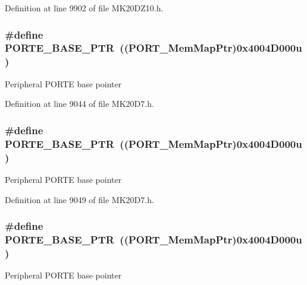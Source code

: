Definition at line 9902 of file M\+K20\+D\+Z10.\+h.

\subsubsection[{\texorpdfstring{P\+O\+R\+T\+E\+\_\+\+B\+A\+S\+E\+\_\+\+P\+TR}{PORTE_BASE_PTR}}]{\setlength{\rightskip}{0pt plus 5cm}\#define P\+O\+R\+T\+E\+\_\+\+B\+A\+S\+E\+\_\+\+P\+TR~(({\bf P\+O\+R\+T\+\_\+\+Mem\+Map\+Ptr})0x4004\+D000u)}\hypertarget{group___p_o_r_t___peripheral_gab166fe285bbb15b52de610f408fe25d3}{}\label{group___p_o_r_t___peripheral_gab166fe285bbb15b52de610f408fe25d3}
Peripheral P\+O\+R\+TE base pointer 

Definition at line 9044 of file M\+K20\+D7.\+h.

\subsubsection[{\texorpdfstring{P\+O\+R\+T\+E\+\_\+\+B\+A\+S\+E\+\_\+\+P\+TR}{PORTE_BASE_PTR}}]{\setlength{\rightskip}{0pt plus 5cm}\#define P\+O\+R\+T\+E\+\_\+\+B\+A\+S\+E\+\_\+\+P\+TR~(({\bf P\+O\+R\+T\+\_\+\+Mem\+Map\+Ptr})0x4004\+D000u)}\hypertarget{group___p_o_r_t___peripheral_gab166fe285bbb15b52de610f408fe25d3}{}\label{group___p_o_r_t___peripheral_gab166fe285bbb15b52de610f408fe25d3}
Peripheral P\+O\+R\+TE base pointer 

Definition at line 9049 of file M\+K20\+D7.\+h.

\subsubsection[{\texorpdfstring{P\+O\+R\+T\+E\+\_\+\+B\+A\+S\+E\+\_\+\+P\+TR}{PORTE_BASE_PTR}}]{\setlength{\rightskip}{0pt plus 5cm}\#define P\+O\+R\+T\+E\+\_\+\+B\+A\+S\+E\+\_\+\+P\+TR~(({\bf P\+O\+R\+T\+\_\+\+Mem\+Map\+Ptr})0x4004\+D000u)}\hypertarget{group___p_o_r_t___peripheral_gab166fe285bbb15b52de610f408fe25d3}{}\label{group___p_o_r_t___peripheral_gab166fe285bbb15b52de610f408fe25d3}
Peripheral P\+O\+R\+TE base pointer 

